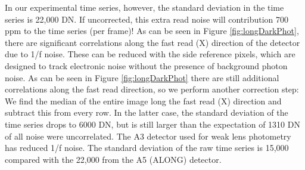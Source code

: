 \documentclass{aastex62}
\begin{document}
In our experimental time series, however, the standard deviation in the time series is 22,000 DN.
If uncorrected, this extra read noise will contribution 700 ppm to the time series (per frame)!
As can be seen in Figure \ref{fig:longDarkPhot}, there are significant correlations along the fast read (X) direction of the detector due to 1/f noise.
These can be reduced with the side reference pixels, which are designed to track electronic noise without the presence of background photon noise.
As can be seen in Figure \ref{fig:longDarkPhot} there are still additional correlations along the fast read direction, so we perform another correction step:
We find the median of the entire image long the fast read (X) direction and subtract this from every row.
In the latter case, the standard deviation of the time series drops to 6000 DN, but is still larger than the expectation of 1310 DN of all noise were uncorrelated.
The A3 detector used for weak lens photometry has reduced 1/f noise.
The standard deviation of the raw time series is 15,000 compared with the 22,000 from the A5 (ALONG) detector.
\end{document}

